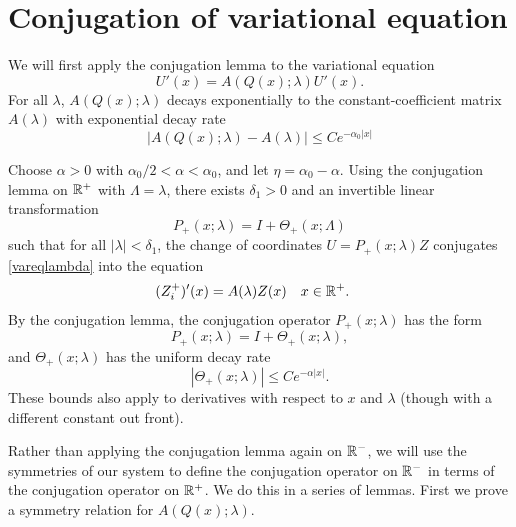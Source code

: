 \documentclass[thesis.tex]{subfiles}
\begin{document}
\section{Conjugation of variational equation}\label{sec:conjvareq}

We will first apply the conjugation lemma to the variational equation
\begin{equation}\label{vareqlambda}
U'(x) = A(Q(x); \lambda) U'(x).
\end{equation}
For all $\lambda$, $A(Q(x); \lambda)$ decays exponentially to the constant-coefficient matrix $A(\lambda)$ with exponential decay rate
\[
|A(Q(x); \lambda) - A(\lambda)| \leq C e^{-\alpha_0 |x|}
\]

Choose $\alpha > 0$ with $\alpha_0/2 < \alpha < \alpha_0$, and let $\eta = \alpha_0 - \alpha$. Using the conjugation lemma on $\mathbb{R}^+$ with $\Lambda = \lambda$, there exists $\delta_1 > 0$ and an invertible linear transformation 
\[
P_+(x; \lambda) = I + \Theta_+(x; \Lambda)
\]
such that for all $|\lambda| < \delta_1$, the change of coordinates $U = P_+(x; \lambda) Z$ conjugates \eqref{vareqlambda} into the equation
\begin{align*}\label{Zplus1}
(Z_i^+)'(x) &= A(\lambda) Z(x) && x \in \mathbb{R}^+.
\end{align*}
By the conjugation lemma, the conjugation operator $P_+(x; \lambda)$ has the form
\begin{equation}\label{projTheta}
P_+(x; \lambda) = I + \Theta_+(x; \lambda),
\end{equation}
and $\Theta_+(x; \lambda)$ has the uniform decay rate
\begin{equation}\label{Thetadecay}
|\Theta_+(x; \lambda)| \leq C e^{-\alpha |x|}.
\end{equation}
These bounds also apply to derivatives with respect to $x$ and $\lambda$ (though with a different constant out front).

Rather than applying the conjugation lemma again on $\mathbb{R}^-$, we will use the symmetries of our system to define the conjugation operator on $\mathbb{R}^-$ in terms of the conjugation operator on $\mathbb{R}^+$. We do this in a series of lemmas. First we prove a symmetry relation for $A(Q(x); \lambda)$.
\end{document}
